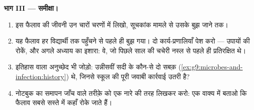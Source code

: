 \begin{problem}
\medskip\noindent\textbf{भाग III --- समीक्षा।}
\begin{enumerate}[resume]
  \item इस फैलाव की जीवनी उन चारों चरणों में लिखो, सूचकांक मामले से
        उसके बुझ जाने तक।
  \item यह फैलाव हर विद्यार्थी तक पहुँचने से पहले ही बुझ गया। दो
        कार्य-प्रणालियाँ पेश करो --- उपायों की रोकें, और अगले अध्याय
        का इशारा: वे, जो पिछले साल की चचेरी नस्ल से पहले ही प्रतिरक्षित
        थे।
  \item इतिहास वाला अनुच्छेद भी जोड़ो: उन्नीसवीं सदी के कौन-से दो सबक़
        (\cref{ex:g9:microbes-and-infection:history}) थे, जिनसे स्कूल
        की पूरी जवाबी कार्रवाई उतरी है?
  \item नोटबुक का समापन जाँच वाले तरीक़े को एक नारे की तरह लिखकर करो:
        एक वाक्य में बताओ कि फैलाव सबसे सस्ते में कहाँ रोके जाते हैं।
\end{enumerate}
\end{problem}
